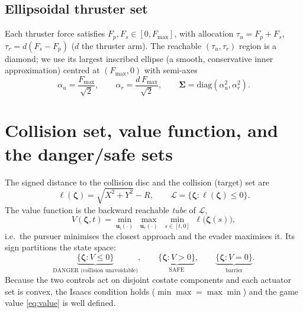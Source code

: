 \documentclass[11pt]{article}
\newcommand{\zvec}{\boldsymbol{\zeta}}
\begin{document}
\subsection{Ellipsoidal thruster set}
Each thruster force satisfies $F_p,F_s\in[0,F_{\max}]$, with allocation
$\tau_u=F_p+F_s$, $\tau_r=d(F_s-F_p)$ ($d$ the thruster arm). The reachable
$(\tau_u,\tau_r)$ region is a diamond; we use its largest inscribed ellipse
(a smooth, conservative inner approximation) centred at $(F_{\max},0)$ with
semi-axes
\begin{equation}
\alpha_u=\frac{F_{\max}}{\sqrt2},\qquad
\alpha_r=\frac{d\,F_{\max}}{\sqrt2},\qquad
\boldsymbol{\Sigma}=\mathrm{diag}(\alpha_u^2,\alpha_r^2).
\end{equation}

\section{Collision set, value function, and the danger/safe sets}
The signed distance to the collision disc and the collision (target) set are
\begin{equation}
\ell(\zvec)=\sqrt{X^2+Y^2}-R,\qquad
\mathcal{L}=\{\zvec:\ell(\zvec)\le 0\}.
\end{equation}
The value function is the backward reachable \emph{tube} of $\mathcal{L}$,
\begin{equation}
V(\zvec,t)=\min_{\mathbf{u}_i(\cdot)}\;\max_{\mathbf{u}_e(\cdot)}\;
\min_{s\in[t,0]}\;\ell\big(\zvec(s)\big),
\label{eq:value}
\end{equation}
i.e.\ the pursuer minimises the closest approach and the evader maximises it. Its
sign partitions the state space:
\begin{equation}
\underbrace{\{\zvec:V\le0\}}_{\text{DANGER (collision unavoidable)}},
\qquad
\underbrace{\{\zvec:V>0\}}_{\text{SAFE}},
\qquad
\underbrace{\{\zvec:V=0\}}_{\text{barrier}} .
\end{equation}
Because the two controls act on disjoint costate components and each actuator set is
convex, the Isaacs condition holds ($\min\max=\max\min$) and the game value
\eqref{eq:value} is well defined.

\end{document}
